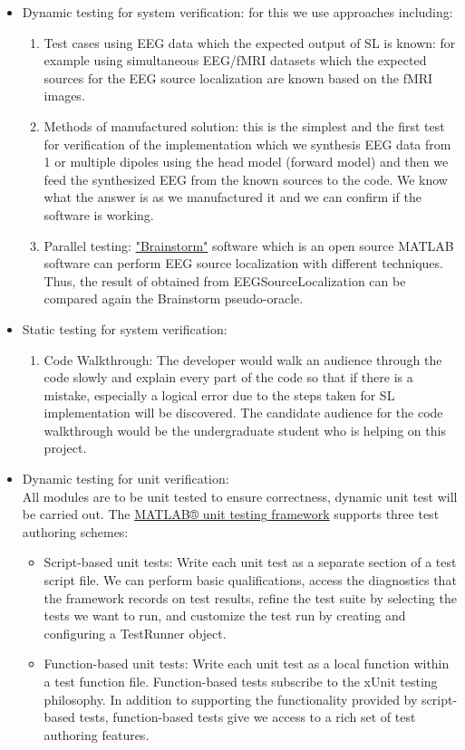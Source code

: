 \documentclass[12pt, titlepage]{article}
\renewcommand{\progname}{EEGSourceLocalization}
\begin{document}
\begin{itemize}
\item Dynamic testing for system verification: for this we use approaches including:
	\begin{enumerate} 
	\item Test cases using EEG data which the expected output of SL is known: for example using simultaneous EEG/fMRI datasets which the expected sources for the EEG source localization are known based on the fMRI images.
	\item Methods of manufactured solution: this is the simplest and the first test for verification of the implementation which we synthesis EEG data from 1 or multiple dipoles using the head model (forward model) and then we feed the synthesized EEG from the known sources to the code. We know what the answer is as we manufactured it and we can confirm if the software is working.
	\item Parallel testing: \href{https://neuroimage.usc.edu/brainstorm/Introduction} {"Brainstorm"} software which is an open source MATLAB software can perform EEG source localization with different techniques. Thus, the result of obtained from \progname{} can be compared again the Brainstorm pseudo-oracle.
	\end{enumerate}
	
\item Static testing for system verification: 
	\begin{enumerate} 
	\item Code Walkthrough: The developer would walk an audience through the code slowly and explain every part of the code so that if there is a mistake, especially a logical error due to the steps taken for SL implementation will be discovered. The candidate audience for the code walkthrough would  be the undergraduate student who is helping on this project. 
	\end{enumerate}
	
\item Dynamic testing for unit verification: \\
All modules are to be unit tested to ensure correctness, dynamic unit test will be carried out. The \href{https://www.mathworks.com/help/matlab/matlab_prog/ways-to-write-unit-tests.html}{MATLAB® unit testing framework} supports three test authoring schemes:

\begin{itemize}
\item Script-based unit tests: Write each unit test as a separate section of a test script file. We can perform basic qualifications, access the diagnostics that the framework records on test results, refine the test suite by selecting the tests we want to run, and customize the test run by creating and configuring a TestRunner object.
\item Function-based unit tests: Write each unit test as a local function within a test function file. Function-based tests subscribe to the xUnit testing philosophy. In addition to supporting the functionality provided by script-based tests, function-based tests give we access to a rich set of test authoring features. 


\end{itemize}
\end{itemize}
\end{document}
